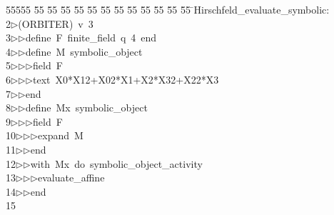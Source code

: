 %
%
\begin{tabbing}
55555 \= 55 \= 55 \= 55 \= 55 \= 55 \= 55 \= 55 \= 55 \= 55 \= 55 \= 55 \= 55 \= \>Hirschfeld\_evaluate\_symbolic:\\[0pt]
2\>$\triangleright$\>(ORBITER)\ v\ 3\ \\[0pt]
3\>$\triangleright$\>$\triangleright$\>define\ F\ finite\_field\ q\ 4\ end\ \\[0pt]
4\>$\triangleright$\>$\triangleright$\>define\ M\ symbolic\_object\ \\[0pt]
5\>$\triangleright$\>$\triangleright$\>$\triangleright$\>field\ F\ \\[0pt]
6\>$\triangleright$\>$\triangleright$\>$\triangleright$\>text\ X0*X12+X02*X1+X2*X32+X22*X3\ \\[0pt]
7\>$\triangleright$\>$\triangleright$\>end\ \\[0pt]
8\>$\triangleright$\>$\triangleright$\>define\ Mx\ symbolic\_object\ \\[0pt]
9\>$\triangleright$\>$\triangleright$\>$\triangleright$\>field\ F\ \\[0pt]
10\>$\triangleright$\>$\triangleright$\>$\triangleright$\>expand\ M\ \\[0pt]
11\>$\triangleright$\>$\triangleright$\>end\ \\[0pt]
12\>$\triangleright$\>$\triangleright$\>with\ Mx\ do\ symbolic\_object\_activity\ \\[0pt]
13\>$\triangleright$\>$\triangleright$\>$\triangleright$\>evaluate\_affine\ \\[0pt]
14\>$\triangleright$\>$\triangleright$\>end\ \\[0pt]
15\>\end{tabbing}
